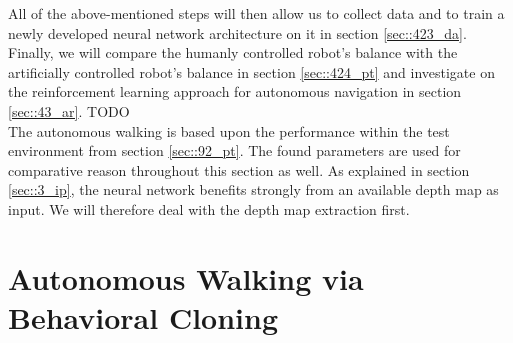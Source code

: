 \FloatBarrier
\label{sec::11_aw}
All of the above-mentioned steps will then allow us to collect data and to train a newly developed neural network architecture on it in section \ref{sec::423_da}. Finally, we will compare the humanly controlled robot's balance with the artificially controlled robot's balance in section \ref{sec::424_pt} and investigate on the reinforcement learning approach for autonomous navigation in section \ref{sec::43_ar}. TODO
\\
The autonomous walking is based upon the performance within the test environment from section \ref{sec::92_pt}. The found parameters are used for comparative reason throughout this section as well. As explained in section \ref{sec::3_ip}, the neural network benefits strongly from an available depth map as input. We will therefore deal with the depth map extraction first.
\FloatBarrier
\section{Autonomous Walking via Behavioral Cloning}
\FloatBarrier
